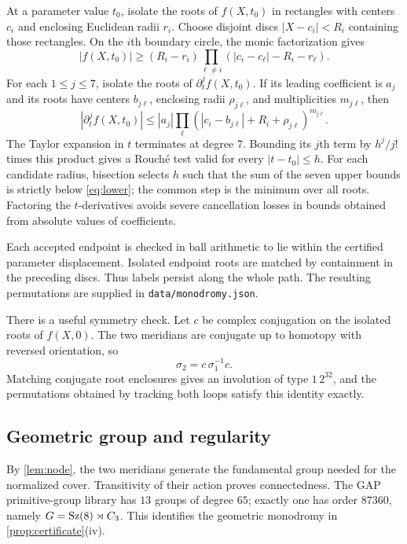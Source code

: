 At a parameter value $t_0$, isolate the roots of $f(X,t_0)$ in rectangles
with centers $c_i$ and enclosing Euclidean radii $r_i$.
Choose disjoint discs $|X-c_i|<R_i$ containing those rectangles.
On the $i$th boundary circle, the monic factorization gives
\begin{equation}\label{eq:lower}
 |f(X,t_0)|\geq
 (R_i-r_i)\prod_{\ell\ne i}(|c_i-c_\ell|-R_i-r_\ell).
\end{equation}
For each $1\leq j\leq7$, isolate the roots of $\partial_t^j f(X,t_0)$.
If its leading coefficient is $a_j$ and its roots have centers $b_{j\ell}$,
enclosing radii $\rho_{j\ell}$, and multiplicities $m_{j\ell}$, then
\[
 |\partial_t^j f(X,t_0)|\leq
 |a_j|\prod_\ell
 (|c_i-b_{j\ell}|+R_i+\rho_{j\ell})^{m_{j\ell}}.
\]
The Taylor expansion in $t$ terminates at degree $7$. Bounding its $j$th
term by $h^j/j!$ times this product gives a Rouch\'e test valid for every
$|t-t_0|\leq h$. For each candidate radius, bisection selects $h$ such
that the sum of the seven upper bounds is strictly below \eqref{eq:lower};
the common step is the minimum over all roots. Factoring the
$t$-derivatives avoids severe cancellation losses in bounds obtained from
absolute values of coefficients.

Each accepted endpoint is checked in ball arithmetic to lie within the
certified parameter displacement. Isolated endpoint roots are matched by
containment in the preceding discs. Thus labels persist along the whole
path. The resulting permutations are supplied in
\texttt{data/monodromy.json}.

There is a useful symmetry check. Let $c$ be complex conjugation on the
isolated roots of $f(X,0)$. The two meridians are conjugate up to homotopy
with reversed orientation, so
\[
 \sigma_2=c\,\sigma_1^{-1}c.
\]
Matching conjugate root enclosures gives an involution of type $1\,2^{32}$,
and the permutations obtained by tracking both loops satisfy this
identity exactly.

\subsection{Geometric group and regularity}

By \cref{lem:node}, the two meridians generate the fundamental group
needed for the normalized cover. Transitivity of their action proves
connectedness. The GAP primitive-group library has $13$ groups of degree
$65$; exactly one has order $87360$, namely $G=\operatorname{Sz}(8)\rtimes C_3$.
This identifies the geometric monodromy in
\cref{prop:certificate}\textup{(iv)}.

